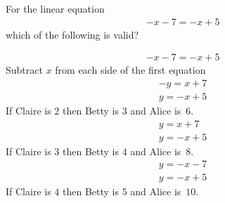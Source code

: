 \documentclass{webquiz}
\begin{document}
\begin{question} %
For the linear equation
\begin{gather*} 
-x-7=-x+5
\end{gather*}
which of the following is valid?
\begin{choice}[columns=2] %
\correct
\begin{gather*} 
-x-7=-x+5
\end{gather*}
\feedback Subtract $x$ from each side of the first equation
\incorrect
\begin{gather*} 
-y=x+7\\
y=-x+5
\end{gather*}
\feedback If Claire is $2$ then Betty is $3$ and Alice is~$6$.
\incorrect
\begin{gather*} 
y=x+7\\
y=-x+5
\end{gather*}
\feedback If Claire is $3$ then Betty is $4$ and Alice is~$8$.
\incorrect
\begin{gather*} 
y=-x-7\\
y=-x+5
\end{gather*}
\feedback If Claire is $4$ then Betty is $5$ and Alice is~$10$.
\end{choice}
\end{question}
\end{document}
